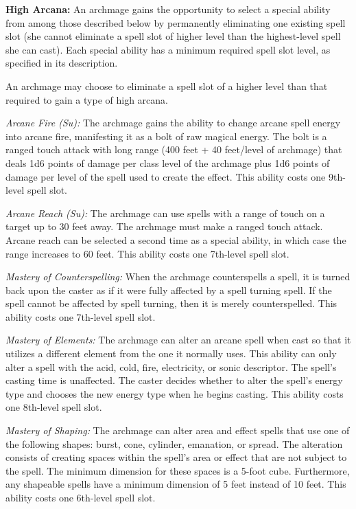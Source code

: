 \textbf{High Arcana:} An archmage gains the opportunity to select a special ability from among those described below by permanently eliminating one existing spell slot (she cannot eliminate a spell slot of higher level than the highest-level spell she can cast). Each special ability has a minimum required spell slot level, as specified in its description.

An archmage may choose to eliminate a spell slot of a higher level than that required to gain a type of high arcana.

\textit{Arcane Fire (Su):} The archmage gains the ability to change arcane spell energy into arcane fire, manifesting it as a bolt of raw magical energy. The bolt is a ranged touch attack with long range (400 feet + 40 feet/level of archmage) that deals 1d6 points of damage per class level of the archmage plus 1d6 points of damage per level of the spell used to create the effect. This ability costs one 9th-level spell slot.

\textit{Arcane Reach (Su):} The archmage can use spells with a range of touch on a target up to 30 feet away. The archmage must make a ranged touch attack. Arcane reach can be selected a second time as a special ability, in which case the range increases to 60 feet. This ability costs one 7th-level spell slot.

\textit{Mastery of Counterspelling:} When the archmage counterspells a spell, it is turned back upon the caster as if it were fully affected by a spell turning spell. If the spell cannot be affected by spell turning, then it is merely counterspelled. This ability costs one 7th-level spell slot.

\textit{Mastery of Elements:} The archmage can alter an arcane spell when cast so that it utilizes a different element from the one it normally uses. This ability can only alter a spell with the acid, cold, fire, electricity, or sonic descriptor. The spell's casting time is unaffected. The caster decides whether to alter the spell's energy type and chooses the new energy type when he begins casting. This ability costs one 8th-level spell slot.

\textit{Mastery of Shaping:} The archmage can alter area and effect spells that use one of the following shapes: burst, cone, cylinder, emanation, or spread. The alteration consists of creating spaces within the spell's area or effect that are not subject to the spell. The minimum dimension for these spaces is a 5-foot cube. Furthermore, any shapeable spells have a minimum dimension of 5 feet instead of 10 feet. This ability costs one 6th-level spell slot.

